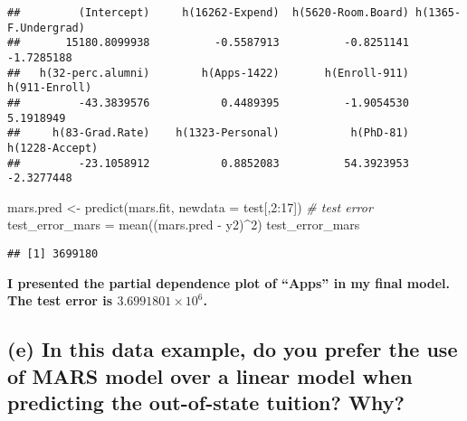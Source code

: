 \documentclass[
]{article}
\newenvironment{Shaded}{\begin{snugshade}}{\end{snugshade}}
\newcommand{\AttributeTok}[1]{\textcolor[rgb]{0.77,0.63,0.00}{#1}}
\newcommand{\CommentTok}[1]{\textcolor[rgb]{0.56,0.35,0.01}{\textit{#1}}}
\newcommand{\DecValTok}[1]{\textcolor[rgb]{0.00,0.00,0.81}{#1}}
\newcommand{\FunctionTok}[1]{\textcolor[rgb]{0.00,0.00,0.00}{#1}}
\newcommand{\NormalTok}[1]{#1}
\newcommand{\OtherTok}[1]{\textcolor[rgb]{0.56,0.35,0.01}{#1}}
\newcommand{\SpecialCharTok}[1]{\textcolor[rgb]{0.00,0.00,0.00}{#1}}
\begin{document}
\begin{Shaded}
\end{Shaded}

\begin{verbatim}
##         (Intercept)     h(16262-Expend)  h(5620-Room.Board) h(1365-F.Undergrad) 
##       15180.8099938          -0.5587913          -0.8251141          -1.7285188 
##   h(32-perc.alumni)        h(Apps-1422)       h(Enroll-911)       h(911-Enroll) 
##         -43.3839576           0.4489395          -1.9054530           5.1918949 
##     h(83-Grad.Rate)    h(1323-Personal)           h(PhD-81)      h(1228-Accept) 
##         -23.1058912           0.8852083          54.3923953          -2.3277448
\end{verbatim}

\begin{Shaded}
\begin{Highlighting}[]
\NormalTok{mars.pred }\OtherTok{\textless{}{-}} \FunctionTok{predict}\NormalTok{(mars.fit, }\AttributeTok{newdata =}\NormalTok{ test[,}\DecValTok{2}\SpecialCharTok{:}\DecValTok{17}\NormalTok{])}
\CommentTok{\# test error}
\NormalTok{test\_error\_mars }\OtherTok{=} \FunctionTok{mean}\NormalTok{((mars.pred }\SpecialCharTok{{-}}\NormalTok{ y2)}\SpecialCharTok{\^{}}\DecValTok{2}\NormalTok{)}
\NormalTok{test\_error\_mars}
\end{Highlighting}
\end{Shaded}

\begin{verbatim}
## [1] 3699180
\end{verbatim}

\textbf{I presented the partial dependence plot of ``Apps'' in my final
model. The test error is \ensuremath{3.6991801\times 10^{6}}.}

\hypertarget{e-in-this-data-example-do-you-prefer-the-use-of-mars-model-over-a-linear-model-when-predicting-the-out-of-state-tuition-why}{%
\subsection{(e) In this data example, do you prefer the use of MARS
model over a linear model when predicting the out-of-state tuition?
Why?}\label{e-in-this-data-example-do-you-prefer-the-use-of-mars-model-over-a-linear-model-when-predicting-the-out-of-state-tuition-why}}
\end{document}
